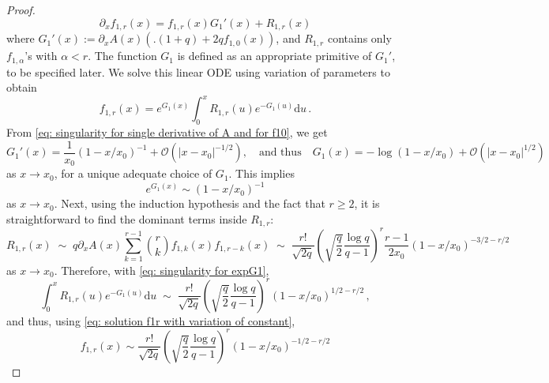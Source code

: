 \documentclass{article}
\theoremstyle{remark}
\newcommand{\cO}{\mathcal{O}}
\newcommand{\abs}[1]{{\left|#1\right|}}
\begin{document}
\begin{proof}
    \begin{equation*}
        \partial_x f_{1,r}(x) = f_{1,r}(x) G_1'(x) + R_{1,r}(x)
    \end{equation*}
    where $G_1'(x) := \partial_x A(x) \left(\big. (1+q) + 2qf_{1,0}(x) \right)$, and $R_{1,r}$ contains only $f_{1,\alpha}$'s with $\alpha<r$.
    The function $G_1$ is defined as an appropriate primitive of $G_1'$, to be specified later.
    We solve this linear ODE using variation of parameters to obtain
    \begin{equation}\label{eq: solution f1r with variation of constant}
        f_{1,r}(x) = e^{G_1(x)} \int_0^x R_{1,r}(u) e^{-G_1(u)} \mathrm{d}u \,.
    \end{equation}
    From \eqref{eq: singularity for single derivative of A and for f10}, we get
    \begin{equation*}
        G_1'(x) = \frac{1}{x_0} (1-x/x_0)^{-1} + \cO\left( \abs{x-x_0}^{-1/2} \right) ,
        \quad\text{and thus}\quad
        G_1(x) = -\log(1-x/x_0) + \cO\left( \abs{x-x_0}^{1/2} \right)
    \end{equation*}
    as $x\to x_0$, for a unique adequate choice of $G_1$.
    This implies
    \begin{equation}\label{eq: singularity for expG1}
        e^{G_1(x)} \sim (1-x/x_0)^{-1} 
    \end{equation}
    as $x\to x_0$.
    Next, using the induction hypothesis and the fact that $r\ge2$, it is straightforward to find the dominant terms inside $R_{1,r}$:
    \begin{equation*}
        R_{1,r}(x) 
        \;\sim\; q \partial_x A(x)
        \sum_{k=1}^{r-1} \binom{r}{k} f_{1,k}(x) f_{1,r-k}(x)
        \;\sim\; \frac{r!}{\sqrt{2q}} \left( \sqrt{\frac{q}{2}} \frac{\log q}{q-1} \right)^r \frac{r-1}{2x_0} (1-x/x_0)^{-3/2 - r/2}
    \end{equation*}
    as $x\to x_0$.
    Therefore, with \eqref{eq: singularity for expG1},
    \begin{equation*}
        \int_0^x R_{1,r}(u) e^{-G_1(u)} \mathrm{d}u 
        \;\sim\; \frac{r!}{\sqrt{2q}} \left( \sqrt{\frac{q}{2}} \frac{\log q}{q-1} \right)^r (1-x/x_0)^{1/2 - r/2} \,,
    \end{equation*}
    and thus, using \eqref{eq: solution f1r with variation of constant},
    \begin{equation*}
        f_{1,r}(x) \sim \frac{r!}{\sqrt{2q}} \left( \sqrt{\frac{q}{2}} \frac{\log q}{q-1} \right)^r (1-x/x_0)^{-1/2 - r/2}
    \end{equation*}

\end{proof}
\end{document}
